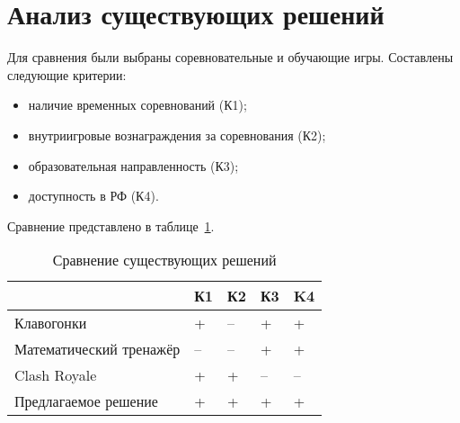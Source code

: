 



\section{Анализ существующих решений}

Для сравнения были выбраны соревновательные и обучающие игры. Составлены следующие критерии:
\begin{itemize}
	\item наличие временных соревнований (К1);
	\item внутриигровые вознаграждения за соревнования (К2);
	\item образовательная направленность (К3);
	\item доступность в РФ (К4).
\end{itemize}

Сравнение представлено в таблице~\ref{tbl:comparison}. 

\begin{table}[h!]
	\centering
	\caption{\label{tbl:comparison}Сравнение существующих решений}
	\begin{tabular}{|l|l|l|l|l|}
		\hline
		& К1 & К2 & К3 & K4\\\hline
		Клавогонки & + & -- & + & + \\\hline
		Математический тренажёр & -- & -- & + & +\\\hline
		Clash Royale  & + & + & -- & --\\\hline
		Предлагаемое решение & + & + & + & + \\\hline
	\end{tabular}
\end{table}
\FloatBarrier


